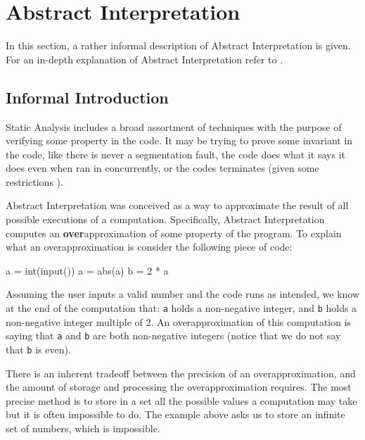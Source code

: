 \documentclass[
11pt, %
english, %
singlespacing, %
headsepline, %
]{MastersDoctoralThesis} %
\newenvironment{Shaded}{}{}
\newcommand{\BuiltInTok}[1]{#1}
\newcommand{\DecValTok}[1]{\textcolor[rgb]{0.25,0.63,0.44}{#1}}
\newcommand{\NormalTok}[1]{#1}
\newcommand{\OperatorTok}[1]{\textcolor[rgb]{0.40,0.40,0.40}{#1}}
\begin{document}
\hypertarget{abstract-interpretation}{%
\section{Abstract Interpretation}\label{abstract-interpretation}}

In this section, a rather informal description of Abstract
Interpretation is given. For an in-depth explanation of Abstract
Interpretation refer to \autocites[Chapters 1 and
4]{nielson2015principles}{cousot_abstract_1977}{nipkow_abstract_2014}.

\hypertarget{informal-introduction}{%
\subsection{Informal Introduction}\label{informal-introduction}}

Static Analysis includes a broad assortment of techniques with the
purpose of verifying some property in the code. It may be trying to
prove some invariant in the code, like there is never a segmentation
fault, the code does what it says it does even when ran in concurrently,
or the codes terminates (given some restrictions
\autocite{urban_static_2015}).

Abstract Interpretation was conceived \autocite{cousot_abstract_1977} as
a way to approximate the result of all possible executions of a
computation. Specifically, Abstract Interpretation computes an
\textbf{over}approximation of some property of the program. To explain
what an overapproximation is consider the following piece of code:

\begin{Shaded}
\begin{Highlighting}[]
\NormalTok{a }\OperatorTok{=} \BuiltInTok{int}\NormalTok{(}\BuiltInTok{input}\NormalTok{())}
\NormalTok{a }\OperatorTok{=} \BuiltInTok{abs}\NormalTok{(a)}
\NormalTok{b }\OperatorTok{=} \DecValTok{2} \OperatorTok{*}\NormalTok{ a}
\end{Highlighting}
\end{Shaded}

Assuming the user inputs a valid number and the code runs as intended,
we know at the end of the computation that: \texttt{a} holds a
non-negative integer, and \texttt{b} holds a non-negative integer
multiple of 2. An overapproximation of this computation is saying that
\texttt{a} and \texttt{b} are both non-negative integers (notice that we
do not say that \texttt{b} is even).

There is an inherent tradeoff between the precision of an
overapproximation, and the amount of storage and processing the
overapproximation requires. The most precise method is to store in a set
all the possible values a computation may take but it is often
impossible to do. The example above asks us to store an infinite set of
numbers, which is impossible.
\end{document}
